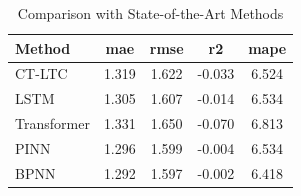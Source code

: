 \begin{table}[htbp]
\centering
\caption{Comparison with State-of-the-Art Methods}
\label{tab:table3_main_results_industrial}
\begin{tabular}{lcccc}
\toprule
Method & \textbf{mae} & \textbf{rmse} & \textbf{r2} & \textbf{mape} \\
\midrule
CT-LTC & 1.319 & 1.622 & -0.033 & 6.524 \\
LSTM & 1.305 & 1.607 & -0.014 & 6.534 \\
Transformer & 1.331 & 1.650 & -0.070 & 6.813 \\
PINN & 1.296 & 1.599 & -0.004 & 6.534 \\
BPNN & 1.292 & 1.597 & -0.002 & 6.418 \\
\bottomrule
\end{tabular}
\end{table}